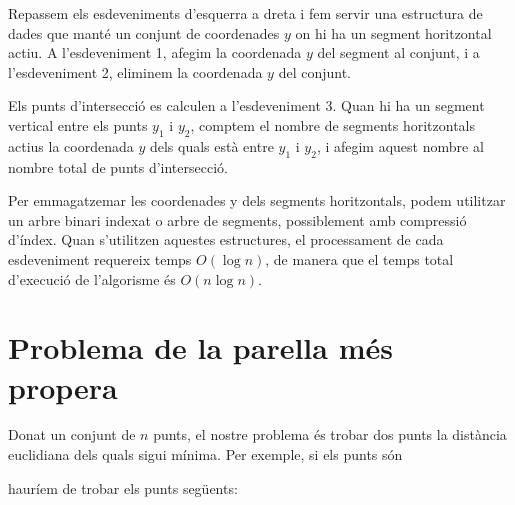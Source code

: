 Repassem els esdeveniments d'esquerra a dreta i fem servir una
estructura de dades que manté un conjunt de coordenades $y$ on hi ha un
segment horitzontal actiu. A l'esdeveniment 1, afegim la coordenada $y$
del segment al conjunt, i a l'esdeveniment 2, eliminem la coordenada $y$
del conjunt.

Els punts d'intersecció es calculen a l'esdeveniment 3. Quan hi ha un
segment vertical entre els punts $y_1$ i $y_2$, comptem el nombre de
segments horitzontals actius la coordenada $y$ dels quals està entre
$y_1$ i $y_2$, i afegim aquest nombre al nombre total de punts
d'intersecció.

Per emmagatzemar les coordenades y dels segments horitzontals, podem
utilitzar un arbre binari indexat o arbre de segments, possiblement
amb compressió d'índex. Quan s'utilitzen aquestes estructures, el
processament de cada esdeveniment requereix temps $O(\log n)$, de
manera que el temps total d'execució de l'algorisme és $O(n \log n)$.

\section{Problema de la parella més propera}


Donat un conjunt de $n$ punts, el nostre problema és trobar dos punts
la distància euclidiana dels quals sigui mínima. Per exemple, si els
punts són
\begin{center}
\end{center}

\begin{samepage}
hauríem de trobar els punts següents:
\begin{center}
\end{center}
\end{samepage}

